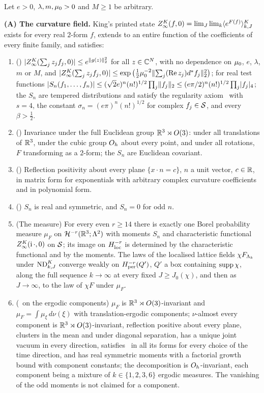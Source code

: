 \begin{theorem}\label{thm:s01:main}
Let $e>0$, $\lambda,m,\mu_0>0$ and $M\ge1$ be arbitrary.

\medskip\noindent\textbf{(A) The curvature field.} King's printed state
$Z^{K}_{\infty}(f,0)=\lim_{J}\lim_{k}\langle e^{F(f)}\rangle^{K}_{k,J}$ exists for every real $2$-form $f$, extends to an entire
function of the coefficients of every finite family, and satisfies:
\begin{enumerate}[label=\textup{(\roman*)},leftmargin=*]
\item \textup{(\OSz)} $\lvert Z^{K}_{\infty}(\sum_jz_jf_j,0)\rvert\le e^{\lVert g(z)\rVert_2^2}$ for all $z\in\mathbb C^N$, with no
dependence on $\mu_0$, $e$, $\lambda$, $m$ or $M$, and
$\lvert Z^{K}_{\infty}(\sum_jz_jf_j,0)\rvert\le\exp\big(\tfrac12\mu_0^{-2}\lVert \sum_j(\operatorname{Re} z_j)d^{*} f_j\rVert_2^2\big)$;
for real test functions $\lvert S_n(f_1,\dots,f_n)\rvert\le(\sqrt2e)^n(n!)^{1/2}\prod_j\lVert f_j\rVert_2
\le(e\pi/2)^n(n!)^{1/2}\prod_j\lvert f_j\rvert_{4}$; the $S_n$ are tempered distributions and satisfy the
regularity axiom \Ezz\ with $s=4$, the constant $\sigma_n=(e\pi)^n(n!)^{1/2}$ for complex
$f_j\in\mathcal S$, and every $\beta>\tfrac12$.
\item \textup{(\OSo)} Invariance under the full Euclidean group $\mathbb R^3\rtimes O(3)$: under all translations of
$\mathbb R^3$, under the cubic group $O_h$ about every point, and under all rotations, $F$ transforming as a
$2$-form; the $S_n$ are Euclidean covariant.
\item \textup{(\OSt)} Reflection positivity about every plane $\{x\cdot n=c\}$, $n$ a unit vector,
$c\in\mathbb R$, in matrix form for exponentials with arbitrary complex curvature coefficients and in polynomial
form.
\item \textup{(\OSth)} $S_n$ is real and symmetric, and $S_n=0$ for odd $n$.
\item \textup{(The measure)} For every even $r\ge14$ there is exactly one Borel probability measure
$\mu_F$ on $\mathcal H^{-r}(\mathbb R^3;\Lambda^2)$ with moments $S_n$ and characteristic functional
$Z^{K}_{\infty}(\mathrm i\,\cdot,0)$ on $\mathcal S$; its image on $H^{-r}_{\rm loc}$ is determined by the characteristic
functional and by the moments. The laws of the localised lattice fields $\chi F_{\Lambda_k}$ under $\mathrm{ND}^{K}_{k,J}$
converge weakly on $H^{-r}_{\rm per}(Q')$, $Q'$ a box containing $\operatorname{supp}\chi$, along the full sequence
$k\to\infty$ at every fixed $J\ge J_0(\chi)$, and then as $J\to\infty$, to the law of $\chi F$ under
$\mu_F$.
\item \textup{(\OSf\ on the ergodic components)} $\mu_F$ is $\mathbb R^3\rtimes O(3)$-invariant and $\mu_F=\int\mu_\xi\,d\nu(\xi)$
with translation-ergodic components; $\nu$-almost every component is $\mathbb R^3\rtimes O(3)$-invariant, reflection positive
about every plane, clusters in the mean and under diagonal separation, has a unique joint vacuum in every
direction, satisfies \OSf\ in all its forms for every choice of the time direction, and has real symmetric
moments with a factorial growth bound with component constants; the decomposition is $O_h$-invariant, each
component being a mixture of $k\in\{1,2,3,6\}$ ergodic measures. The vanishing of the odd moments is not
claimed for a component.
\end{enumerate}


\end{theorem}
